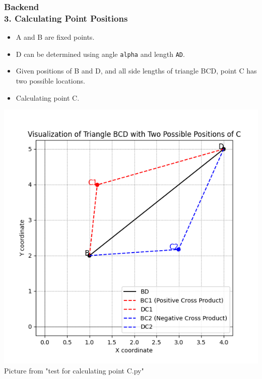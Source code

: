 \documentclass[ucs,10pt]{beamer}
\begin{document}
\begin{frame}
    \frametitle{Backend \\ \small \color{rwth-blue} 3. Calculating Point Positions}
    \begin{minipage}{0.48\linewidth} %
        \begin{itemize}
            \item A and B are fixed points.
            \item D can be determined using angle \texttt{alpha} and length \texttt{AD}.
            \item Given positions of B and D, and all side lengths of triangle BCD, point C has two possible locations.
            \item Calculating point C.
        \end{itemize}
    \end{minipage}
    \hspace{0.02\linewidth} %
    \begin{minipage}{0.48\linewidth} %
        \begin{center}
            \includegraphics[width=\linewidth]{./Figures/test_for_calculating_point_C.png}
            \vspace{0.5em}
            {\tiny Picture from "test for calculating point C.py"}
        \end{center}
    \end{minipage}
\end{frame}
\end{document}
